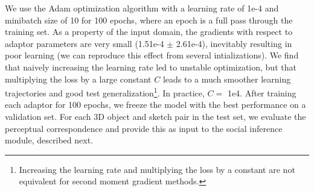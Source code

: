 \documentclass[9pt,twocolumn,twoside]{pnas-new}
\newcommand{\mwu}[1]{{\color{green}{[mwu: #1]}}}
\begin{document}
{We use the Adam optimization algorithm \cite[]{kingma2014adam} with a learning rate of 1e-4 and minibatch size of 10 for 100 epochs, where an epoch is a full pass through the training set. As a property of the input domain, the gradients with respect to adaptor parameters are very small (1.51e-4 $\pm$ 2.61e-4), inevitably resulting in poor learning (we can reproduce this effect from several intializations). We find that naively increasing the learning rate led to unstable optimization, but that multiplying the loss by a large constant $C$ leads to a much smoother learning trajectories and good test generalization\footnote{Increasing the learning rate and multiplying the loss by a constant are not equivalent for second moment gradient methods.}. In practice, $C =$ 1e4. After training each adaptor for 100 epochs, we freeze the model with the best performance on a validation set. For each 3D object and sketch pair in the test set, we evaluate the perceptual correspondence and provide this as input to the social inference module, described next.






}
\end{document}
